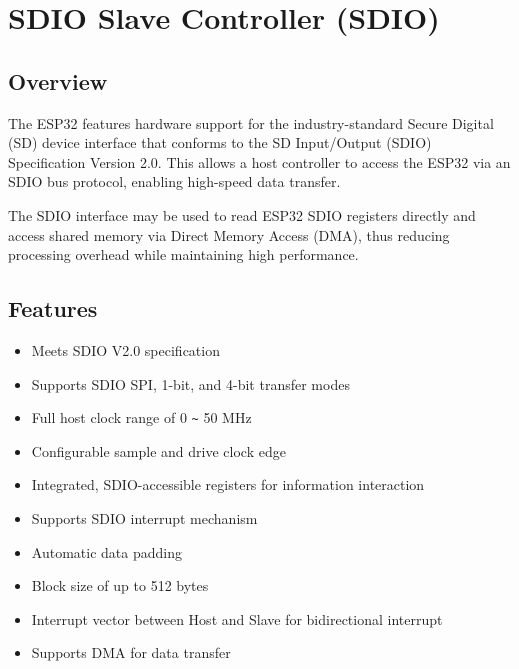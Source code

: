 \documentclass[main\_\_EN.tex]{subfiles}
\begin{document}
\setenglishformatting

\ifglobal
\else
    \listoftodos
    {\let\clearpage\relax \listofdonetodos}
    \tableofcontents
\fi



\hypertarget{sdioslave}{}
\chapter{SDIO Slave Controller (SDIO)}
\label{mod:sdioslave}

\section{Overview}

The ESP32 features hardware support for the industry-standard Secure Digital (SD) device interface that conforms to the SD Input/Output (SDIO) Specification Version 2.0. This allows a host controller to access the ESP32 via an SDIO bus protocol, enabling high-speed data transfer.

The SDIO interface may be used to read ESP32 SDIO registers directly and access shared memory via Direct Memory Access (DMA), thus reducing processing overhead while maintaining high performance.

 \section{Features}
 \begin{itemize}
    \item Meets SDIO V2.0 specification
    \item Supports SDIO SPI, 1-bit, and 4-bit transfer modes
    \item Full host clock range of 0 \verb+~+ 50 MHz
    \item Configurable sample and drive clock edge
    \item Integrated, SDIO-accessible registers for information interaction
    \item Supports SDIO interrupt mechanism
    \item Automatic data padding
    \item Block size of up to 512 bytes
    \item Interrupt vector between Host and Slave for bidirectional interrupt
    \item Supports DMA for data transfer
\end{itemize}
\end{document}
